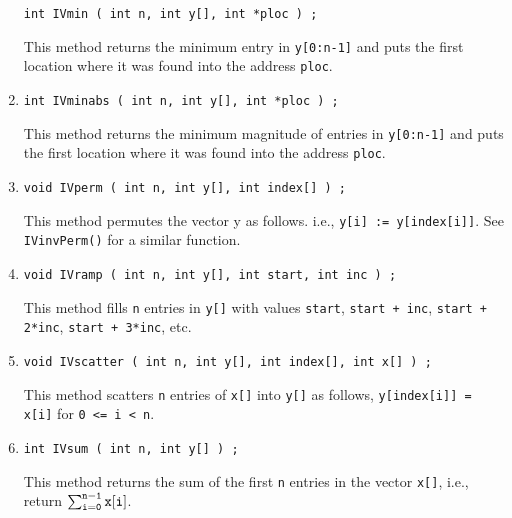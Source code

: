 \begin{enumerate}
\begin{verbatim}
int IVmin ( int n, int y[], int *ploc ) ;
\end{verbatim}
This method returns the minimum entry in {\tt y[0:n-1]}
and puts the first location where it was found into the address
{\tt ploc}.
\item
\begin{verbatim}
int IVminabs ( int n, int y[], int *ploc ) ;
\end{verbatim}
This method returns the minimum magnitude of entries in 
{\tt y[0:n-1]} and puts the first location where 
it was found into the address {\tt ploc}.
\item
\begin{verbatim}
void IVperm ( int n, int y[], int index[] ) ;
\end{verbatim}
This method permutes the vector y as follows.
i.e.,
{\tt y[i] := y[index[i]]}.
See {\tt IVinvPerm()} for a similar function.
\item
\begin{verbatim}
void IVramp ( int n, int y[], int start, int inc ) ;
\end{verbatim}
This method fills {\tt n} entries in {\tt y[]} with 
values 
{\tt start},
{\tt start + inc},
{\tt start + 2*inc},
{\tt start + 3*inc}, etc.
\item
\begin{verbatim}
void IVscatter ( int n, int y[], int index[], int x[] ) ;
\end{verbatim}
This method scatters {\tt n} entries of {\tt x[]} into {\tt y[]} 
as follows,
{\tt y[index[i]] = x[i]} 
for {\tt 0 <= i < n}.
\item
\begin{verbatim}
int IVsum ( int n, int y[] ) ;
\end{verbatim}
This method returns the sum of the first {\tt n} entries 
in the vector {\tt x[]},
i.e., return
$\sum_{\tt i = 0}^{\tt n-1} {\tt x[i]}$.

\end{enumerate}
